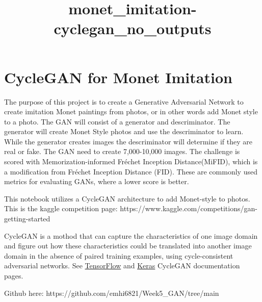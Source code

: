 \documentclass[11pt]{article}
\title{monet\_imitation-cyclegan\_no\_outputs}
\begin{document}
    
    \maketitle
    
    

    
    \section{CycleGAN for Monet
Imitation}\label{cyclegan-for-monet-imitation}

The purpose of this project is to create a Generative Adversarial
Network to create imitation Monet paintings from photos, or in other
words add Monet style to a photo. The GAN will consist of a generator
and descriminator. The generator will create Monet Style photos and use
the descriminator to learn. While the generator creates images the
descriminator will determine if they are real or fake. The GAN need to
create 7,000-10,000 images. The challenge is scored with
Memorization-informed Fréchet Inception Distance(MiFID), which is a
modification from Fréchet Inception Distance (FID). These are commonly
used metrics for evaluating GANs, where a lower score is better.

This notebook utilizes a CycleGAN architecture to add Monet-style to
photos. This is the kaggle competition page:
https://www.kaggle.com/competitions/gan-getting-started

CycleGAN is a mothod that can capture the characteristics of one image
domain and figure out how these characteristics could be translated into
another image domain in the absence of paired training examples, using
cycle-consistent adversarial networks. See
\href{https://www.tensorflow.org/tutorials/generative/cyclegan}{TensorFlow}
and \href{https://keras.io/examples/generative/cyclegan/}{Keras}
CycleGAN documentation pages.

Github here: https://github.com/emhi6821/Week5\_GAN/tree/main
\end{document}
